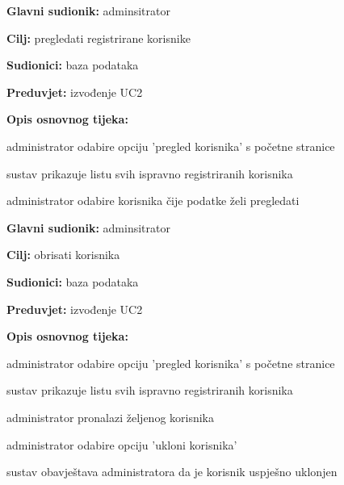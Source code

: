                     
                    \noindent {}
					\begin{packed_item}
	
						\item \textbf{Glavni sudionik: }adminsitrator
						\item  \textbf{Cilj:} pregledati registrirane korisnike
						\item  \textbf{Sudionici:} baza podataka
						\item  \textbf{Preduvjet:} izvođenje UC2
						\item  \textbf{Opis osnovnog tijeka:}
						
						\item[] \begin{packed_enum}
	
							\item administrator odabire opciju 'pregled korisnika' s početne stranice
							\item sustav prikazuje listu svih ispravno registriranih korisnika
							\item administrator odabire korisnika čije podatke želi pregledati

						\end{packed_enum}
					\end{packed_item}

                    \noindent {}
					\begin{packed_item}
	
						\item \textbf{Glavni sudionik: }adminsitrator
						\item  \textbf{Cilj:} obrisati korisnika
						\item  \textbf{Sudionici:} baza podataka
						\item  \textbf{Preduvjet:} izvođenje UC2
						\item  \textbf{Opis osnovnog tijeka:}
						
						\item[] \begin{packed_enum}
							\item administrator odabire opciju 'pregled korisnika' s početne stranice
							\item sustav prikazuje listu svih ispravno registriranih korisnika
							\item administrator pronalazi željenog korisnika
							\item administrator odabire opciju 'ukloni korisnika'
							\item sustav obavještava administratora da je korisnik uspješno uklonjen
                            

						\end{packed_enum}
					\end{packed_item}

